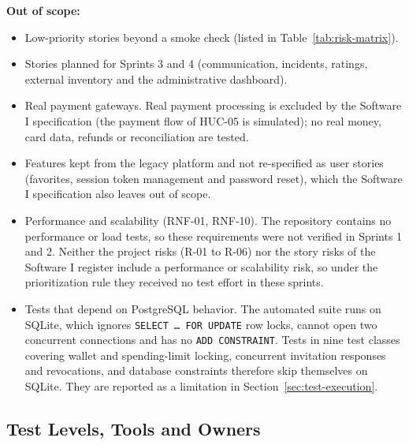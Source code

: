 \textbf{Out of scope:}
\begin{itemize}[nosep]
  \item Low-priority stories beyond a smoke check (listed in Table~\ref{tab:risk-matrix}).
  \item Stories planned for Sprints 3 and 4 (communication, incidents, ratings, external
        inventory and the administrative dashboard).
  \item Real payment gateways. Real payment processing is excluded by the Software I
        specification (the payment flow of HUC-05 is simulated); no real money, card data,
        refunds or reconciliation are tested.
  \item Features kept from the legacy platform and not re-specified as user stories (favorites,
        session token management and password reset), which the Software I specification also
        leaves out of scope.
  \item Performance and scalability (RNF-01, RNF-10). The repository contains no performance or
        load tests, so these requirements were not verified in Sprints 1 and 2. Neither the
        project risks (R-01 to R-06) nor the story risks of the Software I register include a
        performance or scalability risk, so under the prioritization rule they received no test
        effort in these sprints.
  \item Tests that depend on PostgreSQL behavior. The automated suite runs on SQLite, which
        ignores \texttt{SELECT \ldots{} FOR UPDATE} row locks, cannot open two concurrent
        connections and has no \texttt{ADD CONSTRAINT}. Tests in nine test classes covering
        wallet and spending-limit locking, concurrent invitation responses and revocations, and
        database constraints therefore skip themselves on SQLite. They are reported as a
        limitation in Section~\ref{sec:test-execution}.
\end{itemize}

\subsection{Test Levels, Tools and Owners}

